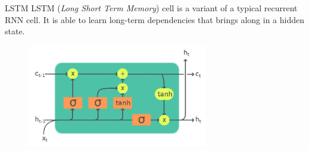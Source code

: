 \documentclass{beamer}
\begin{document}
\begin{frame}{LSTM}
    LSTM (\textit{Long Short Term Memory}) cell is a variant of a typical recurrent RNN cell.
    It is able to learn long-term dependencies that brings along in a hidden state.

    \begin{figure}
        \centering
        \includegraphics[width=0.7\textwidth]{figures/LSTM_Cell.png}
    \end{figure}
    
\end{frame}
\end{document}
